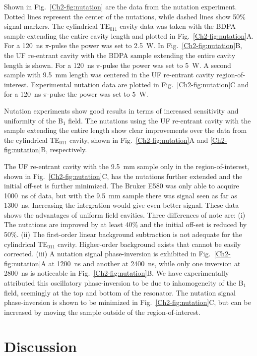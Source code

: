 Shown in Fig.~\ref{Ch2-fig:nutation} are the data from the nutation experiment. Dotted lines represent the center of the nutations, while dashed lines show 50\% signal markers. The cylindrical TE$_{011}$ cavity data was taken with the BDPA sample extending the entire cavity length and plotted in Fig.~\ref{Ch2-fig:nutation}A. For a 120~ns $\pi$-pulse the power was set to 2.5~W. In Fig.~\ref{Ch2-fig:nutation}B, the UF re-entrant \cylTE{} cavity with the BDPA sample extending the entire cavity length is shown. For a 120~ns $\pi$-pulse the power was set to 5~W. A second sample with 9.5~mm length was centered in the UF re-entrant \cylTE{} cavity region-of-interest. Experimental nutation data are plotted in Fig.~\ref{Ch2-fig:nutation}C and for a 120~ns $\pi$-pulse the power was set to 5~W.

Nutation experiments show good results in terms of increased sensitivity and uniformity of the B$_1$ field. The nutations using the UF re-entrant \cylTE{} cavity with the sample extending the entire length show clear improvements over the data from the cylindrical TE$_{011}$ cavity, shown in Fig.~\ref{Ch2-fig:nutation}A and \ref{Ch2-fig:nutation}B, respectively. 

The UF re-entrant \cylTE{} cavity with the 9.5~mm sample only in the region-of-interest, shown in Fig.~\ref{Ch2-fig:nutation}C, has the nutations further extended and the initial off-set is further minimized. The Bruker E580 was only able to acquire 1000~ns of data, but with the 9.5~mm sample there was signal seen as far as 1300~ns. Increasing the integration would give even better signal. These data shows the advantages of uniform field cavities. Three differences of note are: (i) The nutations are improved by at least 40\% and the initial off-set is reduced by 50\%. (ii) The first-order linear background subtraction is not adequate for the cylindrical TE$_{011}$ cavity. Higher-order background exists that cannot be easily corrected. (iii) A nutation signal phase-inversion is exhibited in  Fig.~\ref{Ch2-fig:nutation}A at 1200~ns and another at 2400~ns, while only one inversion at 2800~ns is noticeable in Fig.~\ref{Ch2-fig:nutation}B. We have experimentally attributed this oscillatory phase-inversion to be due to inhomogeneity of the B$_1$ field, seemingly at the top and bottom of the resonator. The nutation signal phase-inversion is shown to be minimized in Fig.~\ref{Ch2-fig:nutation}C, but can be increased by moving the sample outside of the region-of-interest.

\section{Discussion}

